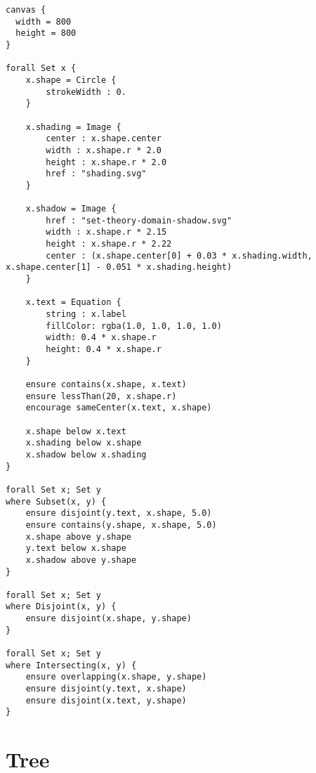 \begin{center}
\begin{mdframed}[style=STYCode]
\begin{lstlisting}[language=Sty-Sets-new,escapechar=@]
canvas {
  width = 800
  height = 800
}

forall Set x {
    x.shape = Circle {
        strokeWidth : 0.
    }

    x.shading = Image {
        center : x.shape.center 
        width : x.shape.r * 2.0
        height : x.shape.r * 2.0
        href : "shading.svg"
    }

    x.shadow = Image {
        href : "set-theory-domain-shadow.svg"
        width : x.shape.r * 2.15
        height : x.shape.r * 2.22
        center : (x.shape.center[0] + 0.03 * x.shading.width, x.shape.center[1] - 0.051 * x.shading.height)
    }

    x.text = Equation {
        string : x.label
        fillColor: rgba(1.0, 1.0, 1.0, 1.0)
        width: 0.4 * x.shape.r
        height: 0.4 * x.shape.r
    }

    ensure contains(x.shape, x.text)
    ensure lessThan(20, x.shape.r)
    encourage sameCenter(x.text, x.shape)

    x.shape below x.text
    x.shading below x.shape
    x.shadow below x.shading
}

forall Set x; Set y
where Subset(x, y) {
    ensure disjoint(y.text, x.shape, 5.0)
    ensure contains(y.shape, x.shape, 5.0)
    x.shape above y.shape
    y.text below x.shape
    x.shadow above y.shape
}

forall Set x; Set y
where Disjoint(x, y) {
    ensure disjoint(x.shape, y.shape)
}

forall Set x; Set y
where Intersecting(x, y) {
    ensure overlapping(x.shape, y.shape)
    ensure disjoint(y.text, x.shape)
    ensure disjoint(x.text, y.shape)
}

\end{lstlisting}
\end{mdframed}
\end{center}

\section{Tree}

